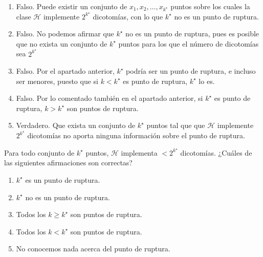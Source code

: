 \documentclass[11pt,leqno]{article}
\theoremstyle{definition}
\begin{document}
\begin{solucion} \textbf{ }
\begin{enumerate}[a]
\item  Falso. Puede existir un conjunto de $x_1, x_2, \dots , x_{k^\star}$ puntos sobre los cuales la clase $\mathcal{H}$ implemente $2^{k^\star}$ dicotomías, con lo que $k^\star$ no es un punto de ruptura.
\item  Falso. No podemos afirmar que $k^\star$ no es un punto de ruptura, pues es posible que no exista un conjunto de $k^\star$ puntos para los que el número de dicotomías sea $2^{k^\star}$
\item  Falso. Por el apartado anterior, $k^\star$ podría ser un punto de ruptura, e incluso ser menores, puesto que si $k < k^\star$ es punto de ruptura, $k^\star$ lo es.
\item  Falso. Por lo comentado también en el apartado anterior, si $k^\star$ es punto de ruptura, $k > k^\star $ son puntos de ruptura.
\item  Verdadero. Que exista un conjunto de $k^\star$ puntos tal que que $\mathcal{H}$ implemente $2^{k^\star}$ dicotomías no aporta ninguna información sobre el punto de ruptura.
\end{enumerate}
\end{solucion}

\begin{cuestion}
Para todo conjunto de $k^\star$ puntos, $\mathcal{H}$ implementa $<2^{k^\star}$ dicotomías. ¿Cuáles de las siguientes afirmaciones son correctas?

\begin{enumerate}[a]
\item  $k^\star$ es un punto de ruptura.
\item  $k^\star$ no es un punto de ruptura.
\item  Todos los $k \geq k^\star$ son puntos de ruptura.
\item  Todos los $k < k^\star$ son puntos de ruptura.
\item  No conocemos nada acerca del punto de ruptura.
\end{enumerate}
\end{cuestion}
\end{document}
